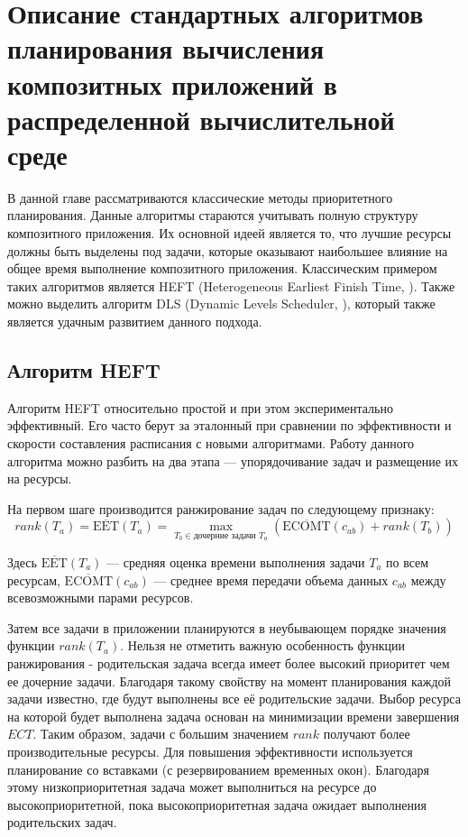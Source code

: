 \chapter*{Описание стандартных алгоритмов планирования вычисления композитных приложений в распределенной вычислительной среде}
\begin{spacing}{1.5}

В данной главе рассматриваются классические методы приоритетного планирования. Данные алгоритмы стараются учитывать полную структуру композитного приложения. Их основной идеей является то, что лучшие ресурсы должны быть выделены под задачи, которые оказывают наибольшее влияние на общее время выполнение композитного приложения.  Классическим примером таких алгоритмов является HEFT (Heterogeneous Earliest Finish Time, \cite{HEFT}). Также можно выделить алгоритм DLS (Dynamic Levels Scheduler, \cite{DLS}), который также является удачным развитием данного подхода.



\section*{Алгоритм HEFT}

Алгоритм HEFT относительно простой и при этом экспериментально эффективный. Его часто берут за эталонный при сравнении по эффективности и скорости составления расписания с новыми алгоритмами. Работу данного алгоритма можно разбить на два этапа --- упорядочивание задач и размещение их на ресурсы.


На первом шаге производится ранжирование задач по следующему признаку:
$$
rank(T_a) = \overline{\mbox{EET}}(T_a) = \max_{T_b \in \text{дочерние задачи $T_a$}}(\overline{\mbox{ECOMT}} (c_{ab}) + rank (T_b))
$$

Здесь $\overline{\mbox{EET}}(T_a)$ --- средняя оценка времени выполнения задачи $T_a$ по всем ресурсам, $\overline{\mbox{ECOMT}}(c_{ab})$ --- среднее время передачи объема данных $c_{ab}$ между всевозможными парами ресурсов.

Затем все задачи в приложении планируются в неубывающем порядке значения функции $rank(T_a)$. Нельзя не отметить важную особенность функции ранжирования - родительская задача всегда имеет более высокий приоритет чем ее дочерние задачи. Благодаря такому свойству на момент планирования каждой задачи известно, где будут выполнены все её родительские задачи. Выбор ресурса на которой будет выполнена задача основан на минимизации времени завершения $ECT$.  Таким образом, задачи с большим значением $rank$ получают более производительные ресурсы. Для повышения эффективности используется планирование со вставками (с резервированием временных окон). Благодаря этому низкоприоритетная задача может выполниться на ресурсе до высокоприоритетной, пока высокоприоритетная задача ожидает выполнения родительских задач.


\end{spacing}
